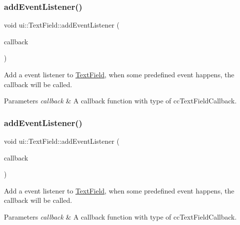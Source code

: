 \subsubsection{\texorpdfstring{add\+Event\+Listener()}{addEventListener()}\hspace{0.1cm}{\footnotesize\ttfamily [1/2]}}
{\footnotesize\ttfamily void ui\+::\+Text\+Field\+::add\+Event\+Listener (\begin{DoxyParamCaption}\item[{const \hyperlink{classui_1_1TextField_a8b58cb15659d59187cfa0586d1420f1f}{cc\+Text\+Field\+Callback} \&}]{callback }\end{DoxyParamCaption})}

Add a event listener to \hyperlink{classui_1_1TextField}{Text\+Field}, when some predefined event happens, the callback will be called. 
\begin{DoxyParams}{Parameters}
{\em callback} & A callback function with type of {\ttfamily cc\+Text\+Field\+Callback}. \\
\hline
\end{DoxyParams}
\mbox{\label{classui_1_1TextField_a2fb48806ef4efd12c4d7db8f58956509}} 
\subsubsection{\texorpdfstring{add\+Event\+Listener()}{addEventListener()}\hspace{0.1cm}{\footnotesize\ttfamily [2/2]}}
{\footnotesize\ttfamily void ui\+::\+Text\+Field\+::add\+Event\+Listener (\begin{DoxyParamCaption}\item[{const \hyperlink{classui_1_1TextField_a8b58cb15659d59187cfa0586d1420f1f}{cc\+Text\+Field\+Callback} \&}]{callback }\end{DoxyParamCaption})}

Add a event listener to \hyperlink{classui_1_1TextField}{Text\+Field}, when some predefined event happens, the callback will be called. 
\begin{DoxyParams}{Parameters}
{\em callback} & A callback function with type of {\ttfamily cc\+Text\+Field\+Callback}. \\
\hline
\end{DoxyParams}
\mbox{\label{classui_1_1TextField_af2e6a186536b2e90b37780255f181a95}} 
